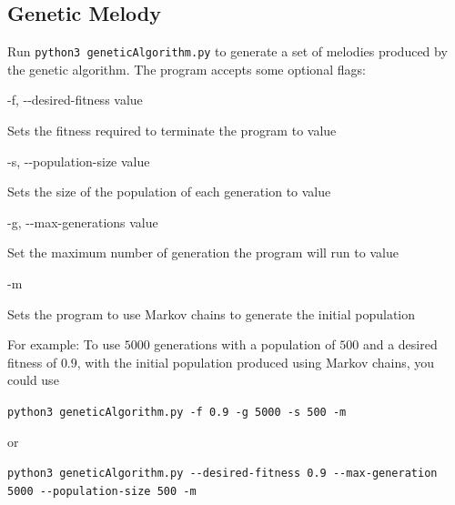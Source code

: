 \subsection{Genetic Melody} \label{software:howtouse:ga}

Run \texttt{python3 geneticAlgorithm.py} to generate a set of melodies produced by the genetic algorithm.
The program accepts some optional flags:

\noindent -f, -{}-desired-fitness value 

Sets the fitness required to terminate the program to value

\noindent -s, -{}-population-size value

Sets the size of the population of each generation to value

\noindent -g, -{}-max-generations value

Set the maximum number of generation the program will run to value

\noindent -m

Sets the program to use Markov chains to generate the initial population

For example: To use $5000$ generations with a population of $500$ and a desired fitness of $0.9$, with the initial population produced using Markov chains, you could use

\texttt{python3 geneticAlgorithm.py -f 0.9 -g 5000 -s 500 -m}

\noindent or

\texttt{python3 geneticAlgorithm.py -{}-desired-fitness 0.9 -{}-max-generation 5000 -{}-population-size 500 -m}
